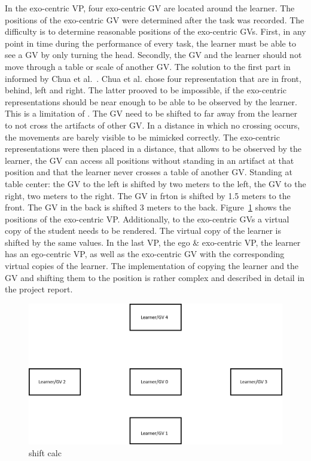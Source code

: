 In the exo-centric VP, four exo-centric GV are located around the learner. The positions of the exo-centric GV were determined after the task was recorded. The difficulty is to determine reasonable positions of the exo-centric GVs. First, in any point in time during the performance of every task, the learner must be able to see a GV by only turning the head. Secondly, the GV and the learner should not move through a table or scale of another GV. The solution to the first part in informed by Chua et al.~\cite{thaichichua}. Chua et al. chose four representation that are in front, behind, left and right. The latter prooved to be impossible, if the exo-centric representations should be near enough to be able to be observed by the learner. This is a limitation of \exgo. The GV need to be shifted to far away from the learner to not cross the artifacts of other GV. In a distance in which no crossing occurs, the movements are barely visible to be mimicked correctly. The exo-centric representations were then placed in a distance, that allows to be observed by the learner,  the GV can access all positions without standing in an artifact at that position and that the learner never crosses a table of another GV. Standing at table center: the GV to the left is shifted by two meters to the left, the GV to the right, two meters to the right. The GV in frton is shifted by 1.5 meters to the front. The GV in the back is shifted 3 meters to the back. Figure~\ref{fig:multireppositions} shows the positions of the exo-centric VP. Additionally, to the exo-centric GVs a virtual copy of the student needs to be rendered. The virtual copy of the learner is shifted by the same values. In the last VP, the ego \& exo-centric VP, the learner has an ego-centric VP, as well as the exo-centric GV with the corresponding virtual copies of the learner. The implementation of copying the learner and the GV and shifting them to the position is rather complex and described in detail in the project report.\\
\begin{figure}[htb]
	\centering
	\includegraphics[width=\textwidth]{figures/positions.png}
	\caption[Positions of exo-centric GVs]{shift calc}
	\label{fig:multireppositions}
\end{figure}

